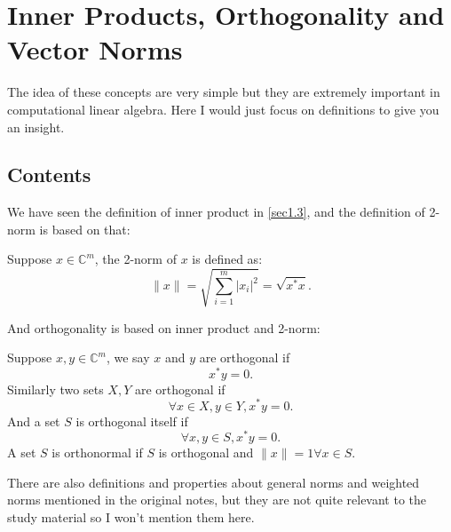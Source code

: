 \section{Inner Products, Orthogonality and Vector Norms}%
\label{sec1.8}
The idea of these concepts are very simple but they are extremely important in computational linear algebra. Here I would just focus on definitions to give you an insight.
\subsection*{Contents}
We have seen the definition of inner product in \autoref{sec1.3}, and the definition of 2-norm is based on that:
\begin{definition}[2-norm]
  Suppose \(x \in \mathbb{C}^{m}\), the 2-norm of \(x\) is defined as:
  \[
    \|x\| = \sqrt{\sum_{i=1}^{m} |x_i|^2} = \sqrt{x^{*}x}
  .\]
\end{definition}
And orthogonality is based on inner product and 2-norm:
\begin{definition}[Orthogonality]
  Suppose \(x, y \in \mathbb{C}^{m}\), we say \(x\) and \(y\) are orthogonal if
  \[
    x^{*}y = 0
  .\]
  Similarly two sets \(X, Y\) are orthogonal if
  \[
    \forall x \in X, y \in Y, x^{*}y = 0
  .\]
  And a set \(S\) is orthogonal itself if
  \[
    \forall x, y \in S,  x^{*}y = 0
  .\]
  A set \(S\) is orthonormal if \(S\) is orthogonal and \(\|x\| = 1 \forall x \in S\).   
\end{definition}
There are also definitions and properties about general norms and weighted norms mentioned in the original notes, but they are not quite relevant to the study material so I won't mention them here. \checked
\bigskip

